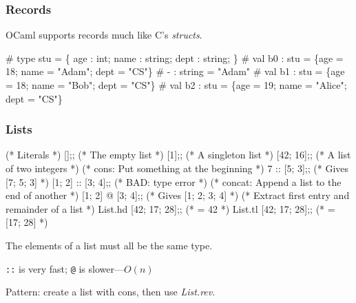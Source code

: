 \documentclass{plt}
\begin{document}
\begin{frame}[fragile]
  \frametitle{Records}

OCaml supports records much like C's \emph{structs}.

\begin{interactive}
# 
type stu = \{ age : int; name : string; dept : string; \}
# 
val b0 : stu = \{age = 18; name = "Adam"; dept = "CS"\}
# 
- : string = "Adam"
# 
val b1 : stu = \{age = 18; name = "Bob"; dept = "CS"\}
# 
val b2 : stu = \{age = 19; name = "Alice"; dept = "CS"\}
\end{interactive}

\end{frame}


\begin{frame}[fragile]
  \frametitle{Lists}
\begin{ocaml}
(* Literals *)
[];;               (* The empty list *)
[1];;              (* A singleton list *)
[42; 16];;         (* A list of two integers *)
(* cons: Put something at the beginning *)
7 :: [5; 3];;      (* Gives [7; 5; 3] *)
[1; 2] :: [3; 4];; (* BAD: type error *)
(* concat: Append a list to the end of another *)
[1; 2] @ [3; 4];;  (* Gives [1; 2; 3; 4] *)
(* Extract first entry and remainder of a list *)
List.hd [42; 17; 28];; (* = 42 *)
List.tl [42; 17; 28];; (* = [17; 28] *)
\end{ocaml}

The elements of a list must all be the same type.

\verb|::| is very fast; \verb|@| is slower---$O(n)$

Pattern: create a list with cons, then use \emph{List.rev}.

\end{frame}
\end{document}
